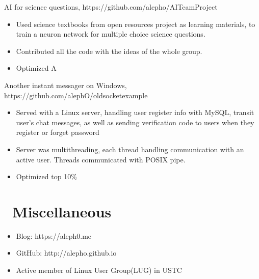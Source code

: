 \documentclass{resume}
\begin{document}
AI for science questions, https://github.com/alepho/AITeamProject
\begin{itemize}
  \item Used science textbooks from open resources project as learning materials, to train a neuron network for multiple choice science questions.
  \item Contributed all the code with the ideas of the whole group.
  \item Optimized A
\end{itemize}


Another instant messager on Windows, https://github.com/alephO/oldsocketexample
\begin{itemize}
  \item Served with a Linux server, handling user register info with MySQL, transit user's chat messages, as well as sending verification code to users when they register or forget password
  \item Server was multithreading, each thread handling communication with an active user. Threads communicated with POSIX pipe. 
  \item Optimized top 10\%
\end{itemize}


\section{\faInfo\ Miscellaneous}
\begin{itemize}[parsep=0.5ex]
  \item Blog: https://aleph0.me
  \item GitHub: http://alepho.github.io
  \item Active member of Linux User Group(LUG) in USTC
\end{itemize}

%
%
\end{document}
